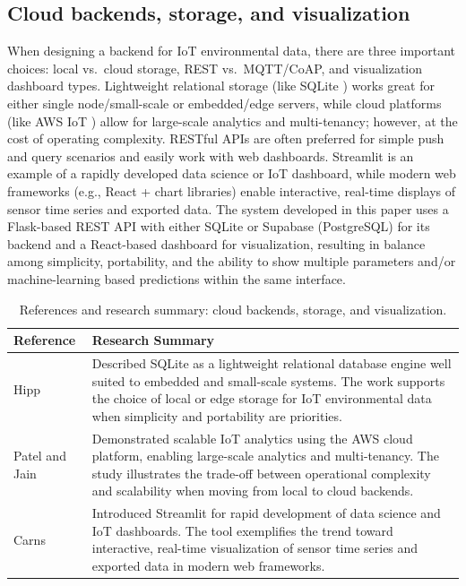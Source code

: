 \documentclass[journal,onecolumn]{IEEEtran}
\begin{document}
\subsection{Cloud backends, storage, and visualization}
When designing a backend for IoT environmental data, there are three important choices: local vs.\ cloud storage, REST vs.\ MQTT/CoAP, and visualization dashboard types. Lightweight relational storage (like SQLite \cite{sqlite2017}) works great for either single node/small-scale or embedded/edge servers, while cloud platforms (like AWS IoT \cite{awsiot2019}) allow for large-scale analytics and multi-tenancy; however, at the cost of operating complexity. RESTful APIs are often preferred for simple push and query scenarios and easily work with web dashboards. Streamlit \cite{streamlit2020} is an example of a rapidly developed data science or IoT dashboard, while modern web frameworks (e.g., React + chart libraries) enable interactive, real-time displays of sensor time series and exported data. The system developed in this paper uses a Flask-based REST API with either SQLite or Supabase (PostgreSQL) for its backend and a React-based dashboard for visualization, resulting in balance among simplicity, portability, and the ability to show multiple parameters and/or machine-learning based predictions within the same interface.

\begin{table}[h]
\centering
\caption{References and research summary: cloud backends, storage, and visualization.}
\label{tab:lit-cloud}
\small
\begin{tabular}{|p{}|p{}|}
\hline
\textbf{Reference} & \textbf{Research Summary} \\
\hline
Hipp \cite{sqlite2017} & Described SQLite as a lightweight relational database engine well suited to embedded and small-scale systems. The work supports the choice of local or edge storage for IoT environmental data when simplicity and portability are priorities. \\
\hline
Patel and Jain \cite{awsiot2019} & Demonstrated scalable IoT analytics using the AWS cloud platform, enabling large-scale analytics and multi-tenancy. The study illustrates the trade-off between operational complexity and scalability when moving from local to cloud backends. \\
\hline
Carns \cite{streamlit2020} & Introduced Streamlit for rapid development of data science and IoT dashboards. The tool exemplifies the trend toward interactive, real-time visualization of sensor time series and exported data in modern web frameworks. \\
\hline
\end{tabular}
\end{table}
\end{document}
